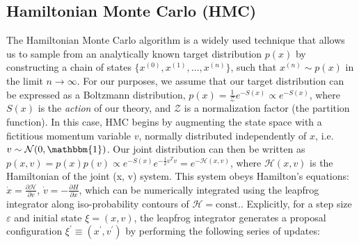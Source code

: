 \documentclass{article} %
\begin{document}
\subsection{\label{subsec:HMC}Hamiltonian Monte Carlo (HMC)}
%
The Hamiltonian Monte Carlo algorithm is a widely used technique that allows us to sample from an analytically known
target distribution \(p(x)\) by constructing a chain of states \(\{x^{(0)}, x^{(1)}, \ldots, x^{(n)}\}\), such that
\(x^{(n)}\sim p(x)\) in the limit \(n\rightarrow\infty\).
%
For our purposes, we assume that our target distribution can be expressed as a Boltzmann distribution, \(p(x) =
\tfrac{1}{\mathcal{Z}} e^{-S(x)}\propto e^{-S(x)}\), where \(S(x)\) is the \emph{action} of our theory, and
\(\mathcal{Z}\) is a normalization factor (the partition function).
%
In this case, HMC begins by augmenting the state space with a fictitious momentum variable \(v\), normally
distributed independently of \(x\), i.e.\ \(v\sim\mathcal{N}(0, \mathbbm{1})\).
%
Our joint distribution can then be written as \(%
   p(x, v) = p(x) p(v) \propto e^{-S(x)} e^{-\frac{1}{2}v^{T}v} = e^{-\mathcal{H}(x, v)}
\), where \(\mathcal{H}(x, v)\) is the Hamiltonian of the joint (x, v) system.
%
This system obeys Hamilton's equations: %
\(\dot{x} = \frac{\partial\mathcal{H}}{\partial v}\), \(\dot{v} = -\frac{\partial H}{\partial x}\), which can be 
numerically integrated using the leapfrog integrator along iso-probability contours of \(\mathcal{H} = \text{const.}\).
%
Explicitly, for a step size \(\varepsilon\) and initial state \(\xi = (x, v)\), the leapfrog integrator generates a
proposal configuration \(\xi^{\prime} \equiv (x^{\prime}, v^{\prime})\) by performing the following series of updates: 
%
\end{document}
